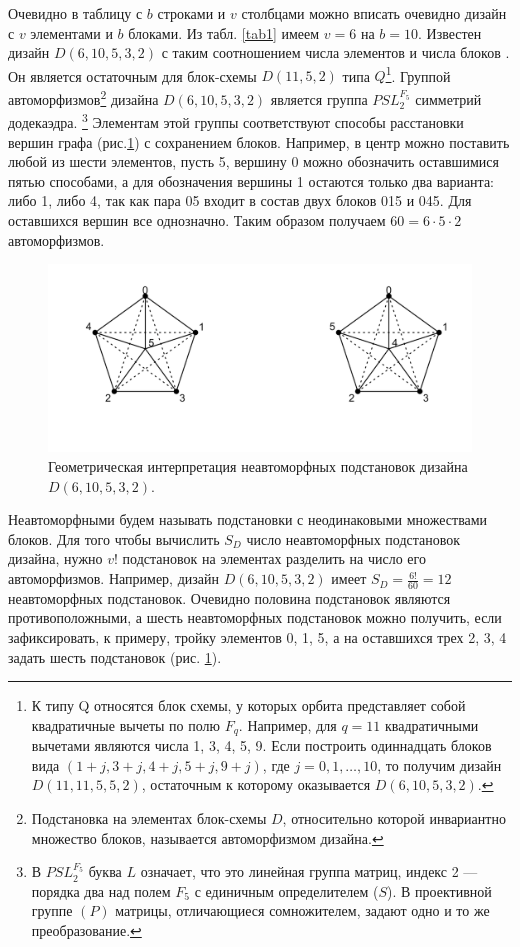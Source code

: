 \documentclass{math-mech-sci}
\begin{document}
Очевидно в таблицу с $b$ строками и $v$ столбцами можно вписать очевидно  дизайн с $v$ элементами и $b$ блоками.  
Из  табл. \ref{tab1} имеем $v=6$  на  $b=10$. Известен  дизайн $D(6,10,5,3,2)$ с таким соотношением числа элементов и числа блоков   \cite{bib:holl1970}. Он  является остаточным для блок-схемы $D(11,5,2)$ типа $Q$\footnote{ К типу  Q относятся блок схемы, у которых орбита представляет собой квадратичные вычеты по полю  $F_q$.  Например, для $q=11$ квадратичными вычетами являются числа 1, 3, 4, 5, 9. Если построить одиннадцать блоков вида  $(1+j, 3+j, 4+j, 5+j, 9+j)$, где $j=0,1,\ldots,10$, то получим дизайн $D(11,11,5,5,2)$, остаточным к которому оказывается  $D(6,10,5,3,2)$. }.
%		
%
Группой  автоморфизмов\footnote{Подстановка на элементах блок-схемы $D$, относительно которой инвариантно множество блоков, называется  автоморфизмом дизайна. 

} 
дизайна $D(6,10,5,3,2)$  является группа  $PSL_2^{F_5}$  симметрий додекаэдра.  \footnote{В $PSL_2^{F_5}$ буква   $L$ означает, что это линейная группа матриц, индекс 2 ---  порядка два над полем $F_5$  с единичным определителем ($S$). В проективной  группе  $(P)$    матрицы, отличающиеся сомножителем, задают одно и то же преобразование.}   Элементам этой группы  соответствуют  способы расстановки вершин графа (рис.\ref{fig:penta})  с сохранением  блоков. 
Например, в центр можно поставить любой из шести элементов,  пусть 5, вершину 0 можно обозначить оставшимися пятью способами, а для обозначения вершины 1 остаются только два варианта: либо 1, либо 4, так как пара 05 входит в состав двух блоков 015 и 045. Для оставшихся  вершин все однозначно.  Таким образом получаем $60=6\cdot 5\cdot 2$ автоморфизмов. 

\begin{figure}
	\centering
	\includegraphics[width=0.7\linewidth]{penta2}
	\caption{ Геометрическая интерпретация неавтоморфных подстановок дизайна $D(6,10,5,3,2)$.}
	\label{fig:penta}
\end{figure}

Неавтоморфными  будем называть  подстановки с неодинаковыми  множествами блоков\cite{bib:alex2012}.  
Для того чтобы вычислить $S_D$ число неавтоморфных подстановок дизайна, нужно  $v!$ подстановок на элементах разделить на число его автоморфизмов. Например, дизайн $D(6,10,5,3,2)$ имеет 
$
S_D=\frac{6!}{60}=12
$
неавтоморфных подстановок. Очевидно половина подстановок являются противоположными, а шесть  неавтоморфных подстановок можно получить, если зафиксировать, к примеру, тройку элементов 0, 1,  5, а на оставшихся трех 2, 3, 4 задать шесть подстановок (рис. \ref{fig:penta}).  
\end{document}
